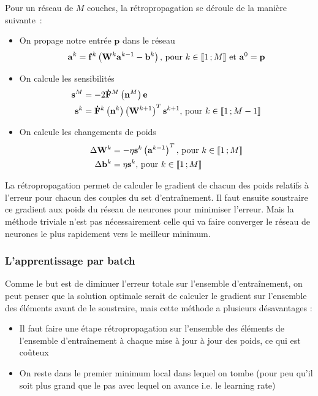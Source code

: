 Pour un réseau de $M$ couches, la rétropropagation se déroule de la manière suivante~:
\begin{itemize}
 \item On propage notre entrée $\mathbf{p}$ dans le réseau
 \begin{equation}
   \mathbf{a}^k = \mathbf{f}^k\left(\mathbf{W}^k\mathbf{a}^{k-1} - \mathbf{b}^k\right) \text{, pour $k \in \mathopen{\llbracket}1\,;M\mathclose{\rrbracket}$ et $\mathbf{a}^0 = \mathbf{p}$}
 \end{equation}
 
 \item On calcule les sensibilités 
 \begin{align}
  \mathbf{s}^M &= -2\mathbf{\dot F}^M\left(\mathbf{n}^M\right)\mathbf{e} \\
  \mathbf{s}^k &= \mathbf{\dot F}^k\left(\mathbf{n}^k\right)\left(\mathbf{W}^{k+1}\right)^T \mathbf{s}^{k+1} \text{, pour $k \in \mathopen{\llbracket}1\,;M-1\mathclose{\rrbracket}$}
 \end{align}
 
 \item On calcule les changements de poids
 \begin{align}
  \Delta \mathbf{W}^k &= - \eta \mathbf{s}^k\left(\mathbf{a}^{k-1}\right)^T \text{, pour $k \in \mathopen{\llbracket}1\,;M\mathclose{\rrbracket}$} \\
  \Delta \mathbf{b}^k &= \eta \mathbf{s}^k \text{, pour $k \in \mathopen{\llbracket}1\,;M\mathclose{\rrbracket}$}
 \end{align}

\end{itemize}

La rétropropagation permet de calculer le gradient de chacun des poids relatifs à l'erreur pour chacun des couples du set d'entraînement. Il faut ensuite soustraire ce gradient
aux poids du réseau de neurones pour minimiser l'erreur. Mais la méthode triviale n'est pas nécessairement celle qui va faire converger le réseau de neurones le plus rapidement vers le meilleur minimum.

\subsubsection{L'apprentissage par batch}

Comme le but est de diminuer l'erreur totale sur l'ensemble d'entraînement, on peut penser que la solution optimale serait de calculer le gradient sur l'ensemble des éléments avant de le soustraire,
mais cette méthode a plusieurs désavantages :
\begin{itemize}
 \item Il faut faire une étape rétropropagation sur l'ensemble des éléments de l'ensemble d'entraînement à chaque mise à jour à jour des poids, ce qui est coûteux
 \item On reste dans le premier minimum local dans lequel on tombe (pour peu qu'il soit plus grand que le pas avec lequel on avance i.e. le learning rate)
\end{itemize}

